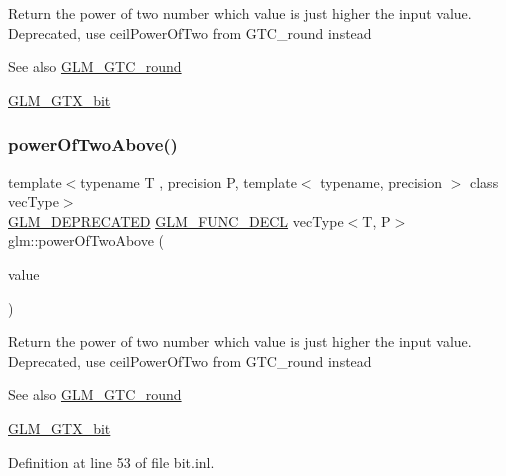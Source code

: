 Return the power of two number which value is just higher the input value. Deprecated, use ceil\+Power\+Of\+Two from G\+T\+C\+\_\+round instead

\begin{DoxySeeAlso}{See also}
\mbox{\hyperlink{group__gtc__round}{G\+L\+M\+\_\+\+G\+T\+C\+\_\+round}} 

\mbox{\hyperlink{group__gtx__bit}{G\+L\+M\+\_\+\+G\+T\+X\+\_\+bit}} 
\end{DoxySeeAlso}
\mbox{\label{group__gtx__bit_gafe08808a50226b75b50e640a08b32ddc}} 
\subsubsection{\texorpdfstring{powerOfTwoAbove()}{powerOfTwoAbove()}\hspace{0.1cm}{\footnotesize\ttfamily [2/2]}}
{\footnotesize\ttfamily template$<$typename T , precision P, template$<$ typename, precision $>$ class vec\+Type$>$ \\
\mbox{\hyperlink{setup_8hpp_a8edfb48cdc249a3ee48406bf179023dc}{G\+L\+M\+\_\+\+D\+E\+P\+R\+E\+C\+A\+T\+ED}} \mbox{\hyperlink{setup_8hpp_ab2d052de21a70539923e9bcbf6e83a51}{G\+L\+M\+\_\+\+F\+U\+N\+C\+\_\+\+D\+E\+CL}} vec\+Type$<$T, P$>$ glm\+::power\+Of\+Two\+Above (\begin{DoxyParamCaption}\item[{vec\+Type$<$ T, P $>$ const \&}]{value }\end{DoxyParamCaption})}

Return the power of two number which value is just higher the input value. Deprecated, use ceil\+Power\+Of\+Two from G\+T\+C\+\_\+round instead

\begin{DoxySeeAlso}{See also}
\mbox{\hyperlink{group__gtc__round}{G\+L\+M\+\_\+\+G\+T\+C\+\_\+round}} 

\mbox{\hyperlink{group__gtx__bit}{G\+L\+M\+\_\+\+G\+T\+X\+\_\+bit}} 
\end{DoxySeeAlso}


Definition at line 53 of file bit.\+inl.

\mbox{\label{group__gtx__bit_ga3de7df63c589325101a2817a56f8e29d}} 
